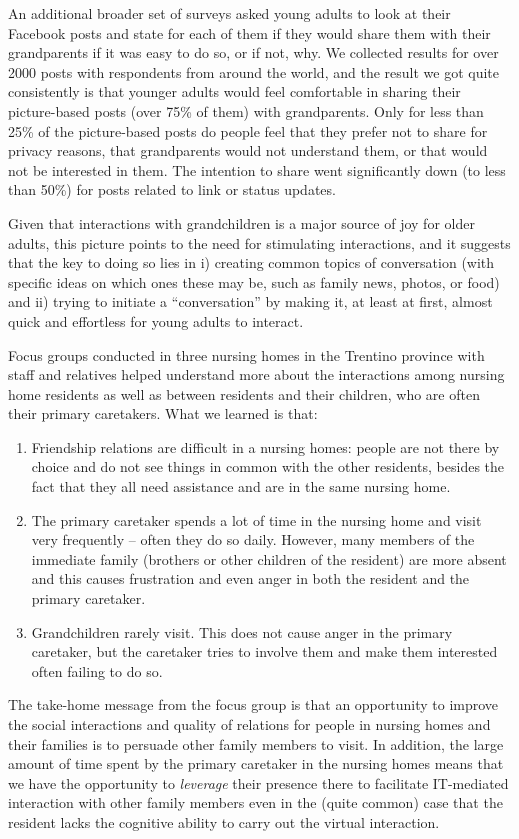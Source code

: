 \documentclass[runningheads,a4paper,oribibl]{llncs}
\begin{document}
An additional broader set of surveys asked young adults to look at their Facebook posts and state for each of them if they would share them with their grandparents if it was easy to do so, or if not, why. We collected results for over 2000 posts with respondents from around the world, and the result we got quite consistently is that younger adults would feel comfortable in sharing their picture-based posts (over 75\% of them) with grandparents. Only for less than 25\% of the picture-based posts do people feel that they prefer not to share for privacy reasons, that grandparents would not understand them, or that would not be interested in them. The intention to share went significantly down (to less than 50\%) for posts related to link or status updates.

Given that interactions with grandchildren is a major source of joy for older adults, this picture points to the need for stimulating interactions, and it suggests that the key to doing so lies in i) creating common topics of conversation (with specific ideas on which ones these may be, such as family news, photos, or food) and ii) trying to initiate a “conversation” by making it, at least at first, almost quick and effortless for young adults to interact.

Focus groups conducted in three nursing homes in the Trentino province with staff and relatives helped understand more about the interactions among nursing home residents as well as between residents and their children, who are often their primary caretakers. What we learned is that:
\begin{enumerate}
\item Friendship relations are difficult in a nursing homes: people are not there by choice and do not see things in common with the other residents, besides the fact that they all need assistance and are in the same nursing home.
\item The primary caretaker spends a lot of time in the nursing home and visit very frequently – often they do so daily. However, many members of the immediate family (brothers or other children of the resident) are more absent and this causes frustration and even anger in both the resident and the primary caretaker.
\item Grandchildren rarely visit. This does not cause anger in the primary caretaker, but the caretaker tries to involve them and make them interested often failing to do so.
\end{enumerate}


The take-home message from the focus group is that an opportunity to improve the social interactions and quality of relations for people in nursing homes and their families is to persuade other family members to visit. In addition, the large amount of time spent by the primary caretaker in the nursing homes means that we have the opportunity to \emph{leverage} their presence there to facilitate IT-mediated interaction with other family members even in the (quite common) case that the resident lacks the cognitive ability to carry out the virtual interaction.
\end{document}
